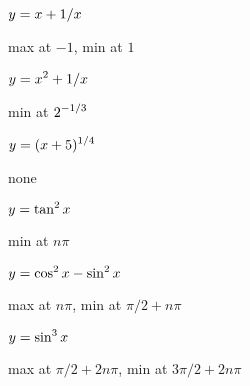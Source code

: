 \begin{exercises}
\exercise $\displaystyle y = x+ 1/x$
\begin{answer} max at $-1$, min at $1$
\end{answer}

\exercise $\displaystyle y = x^2+ 1/x$
\begin{answer} min at $\displaystyle 2^{-1/3}$
\end{answer}

\exercise $\displaystyle y = (x+5)^{1/4}$
\begin{answer} none
\end{answer}

\exercise $\displaystyle y = \tan^2 x$
\begin{answer} min at $n\pi$
\end{answer}

\exercise $\displaystyle y =\cos^2 x - \sin^2 x$
\begin{answer} max at $n\pi$, min at $\pi/2+n\pi$
\end{answer}

\exercise $\displaystyle y = \sin^3 x$
\begin{answer} max at $\pi/2+2n\pi$, min at $3\pi/2+2n\pi$
\end{answer}

\endtwocol
\end{exercises}

